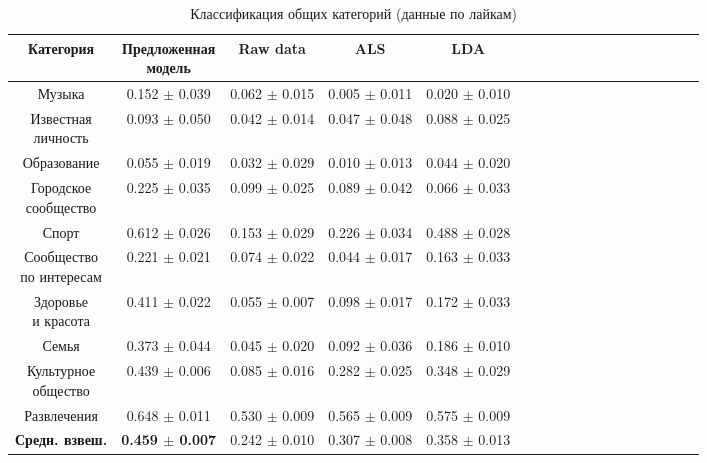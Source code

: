 \documentclass[times,specification,annotation]{itmo-student-thesis}
\begin{document}
\begin{table}[!h]
\caption{Классификация общих категорий (данные по лайкам)}\label{tab-likes-g}
\centering
\begin{tabular}{|*{18}{c|}}\hline
Категория & \thead{Предложенная \\  модель}  & Raw data & ALS & LDA \\\hline
Музыка         				    	& 0.152 $\pm$ 0.039 & 0.062 $\pm$ 0.015 & 0.005 $\pm$ 0.011 & 0.020 $\pm$ 0.010  \\\hline
\thead{Известная \\ личность}
         							    	& 0.093 $\pm$ 0.050 & 0.042 $\pm$ 0.014 & 0.047 $\pm$ 0.048 & 0.088 $\pm$ 0.025 \\\hline
Образование              		& 0.055 $\pm$ 0.019 & 0.032 $\pm$ 0.029 & 0.010 $\pm$ 0.013 & 0.044 $\pm$ 0.020 \\\hline
\thead{Городское \\ сообщество}
                                      		& 0.225 $\pm$ 0.035 & 0.099 $\pm$ 0.025 & 0.089 $\pm$ 0.042 & 0.066 $\pm$ 0.033 \\\hline
Спорт        							& 0.612 $\pm$ 0.026 & 0.153 $\pm$ 0.029 & 0.226 $\pm$ 0.034 & 0.488 $\pm$ 0.028 \\\hline
\thead{Сообщество \\ по интересам}
         									& 0.221 $\pm$ 0.021 & 0.074 $\pm$ 0.022 & 0.044 $\pm$ 0.017 & 0.163 $\pm$ 0.033 \\\hline
\thead{Здоровье \\ и красота}
               							    & 0.411 $\pm$ 0.022 & 0.055 $\pm$ 0.007 & 0.098 $\pm$ 0.017 & 0.172 $\pm$ 0.033 \\\hline
Семья  								& 0.373 $\pm$ 0.044 & 0.045 $\pm$ 0.020 & 0.092 $\pm$ 0.036 & 0.186 $\pm$ 0.010 \\\hline
\thead{Культурное \\ общество}
           									& 0.439 $\pm$ 0.006 & 0.085 $\pm$ 0.016 & 0.282 $\pm$ 0.025 & 0.348 $\pm$ 0.029 \\\hline
Развлечения           			& 0.648 $\pm$ 0.011 & 0.530 $\pm$ 0.009 & 0.565 $\pm$ 0.009 & 0.575 $\pm$ 0.009 \\\hline
\textbf{Средн. взвеш.}& \textbf{0.459 $\pm$ 0.007} & 0.242 $\pm$ 0.010 & 0.307 $\pm$ 0.008 & 0.358 $\pm$ 0.013 \\\hline
\end{tabular}
\end{table}
\end{document}
